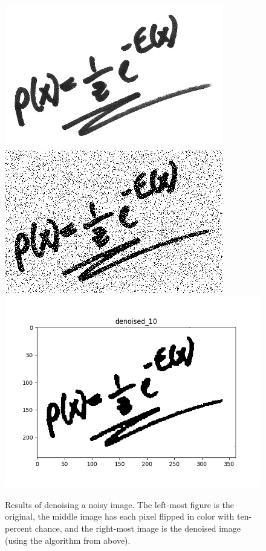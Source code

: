 \documentclass[12pt]{article}
\begin{document}
\begin{enumerate}[label=(\alph*)]
\begin{figure}[!ht]
\centering
\includegraphics[scale=0.33]{programming/orig.png}
\includegraphics[scale=0.33]{programming/noisy_10.png}
\includegraphics[scale=0.33]{programming/denoised_10.png}
\caption{Results of denoising a noisy image. The left-most figure is the original, the middle image has each pixel flipped in color with ten-percent chance, and the right-most image is the denoised image (using the algorithm from above).}
\label{fig:denoised_10}
\end{figure}


\end{enumerate}
\end{document}
